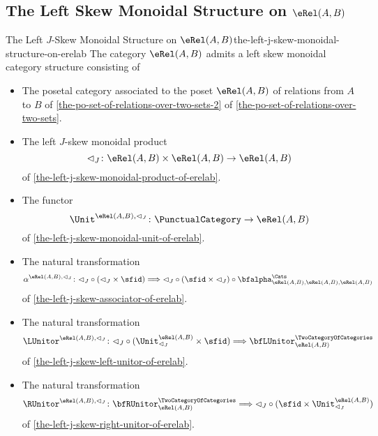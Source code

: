 \subsection{The Left Skew Monoidal Structure on \texorpdfstring{$\eRel(A,B)$}{Rel(A,B)}}\label{subsection-the-left-skew-monoidal-structure-on-rel-a-b}
\begin{proposition}{The Left $J$-Skew Monoidal Structure on $\eRel(A,B)$}{the-left-j-skew-monoidal-structure-on-erelab}%
    The category $\eRel(A,B)$ admits a left skew monoidal category structure consisting of%
    \begin{itemize}
        \item{}The posetal category associated to the poset $\eRel(A,B)$ of relations from $A$ to $B$ of \cref{the-po-set-of-relations-over-two-sets-2} of \cref{the-po-set-of-relations-over-two-sets}.
        \item{}The left $J$-skew monoidal product
            \[
                \lhd_{J}%
                \colon%
                \eRel(A,B)\times\eRel(A,B)%
                \to%
                \eRel(A,B)
            \]%
            of \cref{the-left-j-skew-monoidal-product-of-erelab}.
        \item{}The functor
            \[
                \Unit^{\eRel(A,B),\lhd_{J}}
                \colon
                \PunctualCategory
                \to
                \eRel(A,B)
            \]
            of \cref{the-left-j-skew-monoidal-unit-of-erelab}.
        \item{}The natural transformation
            \begingroup\small
            \[
                \alpha^{\eRel(A,B),\lhd_{J}}%
                \colon%
                {\lhd_{J}}\circ{({\lhd_{J}}\times\sfid)}%
                \Longrightarrow%
                {\lhd_{J}}\circ{(\sfid\times{\lhd_{J}})}\circ{\bfalpha^{\Cats}_{\eRel(A,B),\eRel(A,B),\eRel(A,B)}}%
            \]
            \endgroup
            of \cref{the-left-j-skew-associator-of-erelab}.
        \item{}The natural transformation
            \[
                \LUnitor^{\eRel(A,B),\lhd_{J}}
                \colon
                {\lhd_{J}}\circ{({\Unit^{\eRel(A,B)}_{\lhd_{J}}}\times{\sfid})}
                \Longrightarrow
                \bfLUnitor^{\TwoCategoryOfCategories}_{\eRel(A,B)}%
            \]
            of \cref{the-left-j-skew-left-unitor-of-erelab}.
        \item{}The natural transformation
            \[
                \RUnitor^{\eRel(A,B),\lhd_{J}}
                \colon
                \bfRUnitor^{\TwoCategoryOfCategories}_{\eRel(A,B)}
                \Longrightarrow
                {\lhd_{J}}\circ{(\sfid\times\Unit^{\eRel(A,B)}_{\lhd_{J}})}
            \]
            of \cref{the-left-j-skew-right-unitor-of-erelab}.
    \end{itemize}
\end{proposition}
